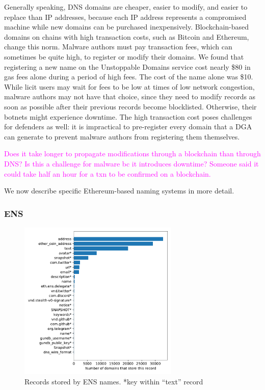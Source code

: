 \documentclass[10pt,sigconf,letterpaper]{acmart}
\newcommand{\randall}{\ding{110}\ding{43}\textcolor{magenta}}
\newcommand{\randall}{}
\begin{document}
Generally speaking, DNS domains are cheaper, easier to modify, and 
easier to replace than IP 
addresses, because each IP address represents a compromised machine while 
new domains can be 
purchased inexpensively. Blockchain-based domains on chains with high 
transaction costs, such as 
Bitcoin and Ethereum, change this norm. Malware authors must pay 
transaction fees, which can 
sometimes be quite high, to register or modify their domains. We found that 
registering a new name 
on the Unstoppable Domains service cost nearly \$80 in gas fees alone during a 
period of high fees. 
The cost of the name alone was \$10. While licit users may wait for fees to be 
low at times of low 
network congestion, malware authors may not have that choice, since they 
need to modify records as 
soon as possible after their previous records become blocklisted. Otherwise, 
their botnets might 
experience downtime. The high transaction cost poses challenges for 
defenders as well: it is 
impractical to pre-register every domain that a DGA can generate to prevent 
malware authors from 
registering them themselves. 

\randall{Does it take longer to propagate modifications through a blockchain 
than through DNS? Is this a challenge for malware bc it introduces 
downtime? 
Someone said it could take half an hour for a txn to be confirmed on a 
blockchain.}

We now describe specific Ethereum-based naming systems in more detail.

\subsubsection{ENS}

\begin{figure}[t]
	\centering
	\includegraphics[width=3in]{figs/ens_names.pdf}
	\caption{Records stored by ENS names. *key within ``text'' record}
	\label{fig:ens_records}
\end{figure}
\end{document}
